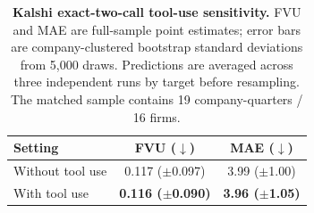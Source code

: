 \begin{table}[t]
\centering
\caption{\textbf{Kalshi exact-two-call tool-use sensitivity.}
FVU and MAE are full-sample point estimates; error bars are company-clustered bootstrap
standard deviations from 5,000 draws. Predictions are averaged across three independent runs
by target before resampling. The matched sample contains 19 company-quarters / 16 firms.}
\label{tab:kalshi_tool_fvu_mae_exact_two_call}
\setlength{\tabcolsep}{15pt}
\begin{tabular}{lcc}
\toprule
Setting & FVU ($\downarrow$) & MAE ($\downarrow$) \\
\midrule
\quad Without tool use & 0.117 {\footnotesize($\pm$0.097)} & 3.99 {\footnotesize($\pm$1.00)} \\
\quad With tool use & \textbf{0.116 {\footnotesize($\pm$0.090)}} & \textbf{3.96 {\footnotesize($\pm$1.05)}} \\
\bottomrule
\end{tabular}
\end{table}
